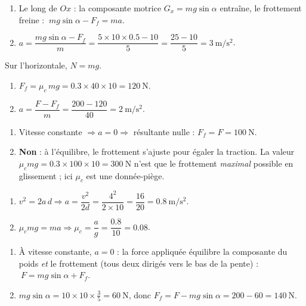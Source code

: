 \documentclass[11pt,a4paper]{article}
\begin{document}

\begin{corrige}
\begin{enumerate}[label=\alph*)]
  \item Le long de $Ox$ : la composante motrice $G_x=mg\sin\alpha$ entraîne, le frottement freine :
        $\ mg\sin\alpha-F_f=ma$.
  \item $a=\dfrac{mg\sin\alpha-F_f}{m}=\dfrac{5\times10\times\num{0,5}-10}{5}=\dfrac{25-10}{5}=\qty{3}{\metre\per\second\squared}$.
\end{enumerate}
\end{corrige}

\begin{corrige}
Sur l'horizontale, $N=mg$.
\begin{enumerate}[label=\alph*)]
  \item $F_f=\mu_c\,mg=\num{0,3}\times 40\times 10=\qty{120}{\newton}$.
  \item $a=\dfrac{F-F_f}{m}=\dfrac{200-120}{40}=\qty{2}{\metre\per\second\squared}$.
\end{enumerate}
\end{corrige}

\begin{corrige}
\begin{enumerate}[label=\alph*)]
  \item Vitesse constante $\Rightarrow a=0 \Rightarrow$ résultante nulle : $F_f=F=\qty{100}{\newton}$.
  \item \textbf{Non} : à l'équilibre, le frottement s'ajuste pour égaler la traction. La valeur
        $\mu_c mg=\num{0,3}\times100\times10=\qty{300}{\newton}$ n'est que le frottement \emph{maximal}
        possible en glissement ; ici $\mu_c$ est une donnée-piège.
\end{enumerate}
\end{corrige}

\begin{corrige}
\begin{enumerate}[label=\alph*)]
  \item $v^2=2a\,d \Rightarrow a=\dfrac{v^2}{2d}=\dfrac{4^2}{2\times 10}=\dfrac{16}{20}=\qty{0,8}{\metre\per\second\squared}$.
  \item $\mu_c mg=ma \Rightarrow \mu_c=\dfrac{a}{g}=\dfrac{\num{0,8}}{10}=\num{0,08}$.
\end{enumerate}
\end{corrige}

\begin{corrige}
\begin{enumerate}[label=\alph*)]
  \item À vitesse constante, $a=0$ : la force appliquée équilibre la composante du poids \emph{et} le
        frottement (tous deux dirigés vers le bas de la pente) : $\ F=mg\sin\alpha+F_f$.
  \item $mg\sin\alpha=10\times10\times\tfrac{3}{5}=\qty{60}{\newton}$, donc
        $F_f=F-mg\sin\alpha=200-60=\qty{140}{\newton}$.
\end{enumerate}
\end{corrige}
\end{document}

